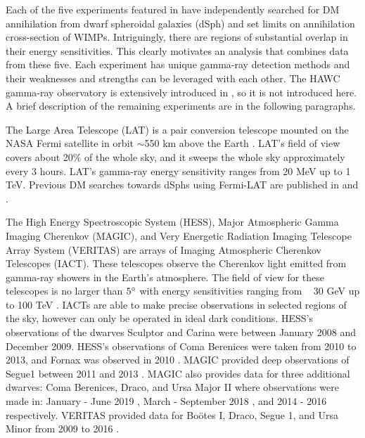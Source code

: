 Each of the five experiments featured in  have independently searched for DM annihilation from dwarf spheroidal galaxies (dSph) and set limits on annihilation cross-section of WIMPs.
Intriguingly, there are regions of substantial overlap in their energy sensitivities.
This clearly motivates an analysis that combines data from these five.
Each experiment has unique gamma-ray detection methods and their weaknesses and strengths can be leveraged with each other.
The HAWC gamma-ray observatory is extensively introduced in , so it is not introduced here.
A brief description of the remaining experiments are in the following paragraphs.

The Large Area Telescope (LAT) is a pair conversion telescope mounted on the NASA Fermi satellite in orbit $\sim$550 km above the Earth \cite{FermiLAT}.
LAT's field of view covers about 20\% of the whole sky, and it sweeps the whole sky approximately every 3 hours.
LAT's gamma-ray energy sensitivity ranges from 20 MeV up to 1 TeV.
Previous DM searches towards dSphs using Fermi-LAT are published in \cite{FermiLAT:dm1} and \cite{FermiLAT:dm2}.

\sloppy The High Energy Spectroscopic System (HESS), Major Atmospheric Gamma Imaging
Cherenkov (MAGIC), and Very Energetic Radiation Imaging Telescope Array System (VERITAS) are arrays of Imaging Atmospheric Cherenkov Telescopes (IACT).
These telescopes observe the Cherenkov light emitted from gamma-ray showers in the Earth's atmosphere.
The field of view for these telescopes is no larger than $5\degree$ with energy sensitivities ranging from ~ 30 GeV up to 100 TeV \cite{HESS,MAGIC,VERITAS}.
IACTs are able to make precise observations in selected regions of the sky, however can only be operated in ideal dark conditions.
HESS's  observations of the dwarves Sculptor and Carina were between January 2008 and December 2009.
HESS's observations of Coma Berenices were taken from 2010 to 2013, and Fornax was observed in 2010 \cite{HESS:dm_sculptor_carina,HESS:dm_dwarves,HESS:dm_gamma_lines}.
MAGIC provided deep observations of Segue1 between 2011 and 2013 \cite{MAGIC:dm_segue1}.
MAGIC also provides data for three additional dwarves: Coma Berenices, Draco, and Ursa Major II where observations were made in: January - June 2019 \cite{MAGIC:dm_comab_draco}, March - September 2018 \cite{MAGIC:dm_comab_draco}, and 2014 - 2016 \cite{MAGIC:dm_uma2} respectively.
VERITAS provided data for Boötes I, Draco, Segue 1, and Ursa Minor from 2009 to 2016 \cite{VERITAS:dm_dwarves}.

